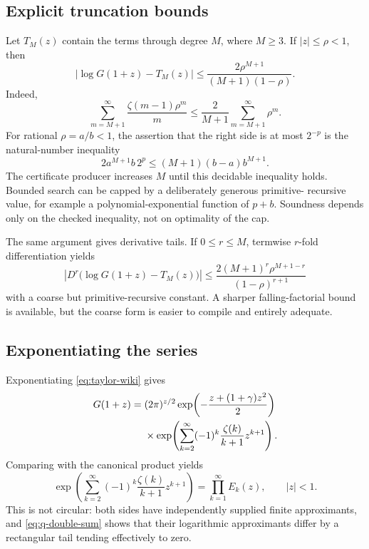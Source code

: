 \subsection{Explicit truncation bounds}

Let \(T_M(z)\) contain the terms through degree \(M\), where \(M\ge3\).  If
\(|z|\le\rho<1\), then
\begin{equation}\label{eq:taylor-tail}
 \left|\log G(1+z)-T_M(z)\right|
 \le
 \frac{2\rho^{M+1}}{(M+1)(1-\rho)}.
\end{equation}
Indeed,
\[
 \sum_{m=M+1}^{\infty}
 \frac{\zeta(m-1)\rho^m}{m}
 \le \frac2{M+1}\sum_{m=M+1}^{\infty}\rho^m.
\]
For rational \(\rho=a/b<1\), the assertion that the right side is at most
\(2^{-p}\) is the natural-number inequality
\begin{equation}\label{eq:taylor-tail-cleared}
 2a^{M+1}b\,2^p
 \le (M+1)(b-a)b^{M+1}.
\end{equation}
The certificate producer increases \(M\) until this decidable inequality
holds.  Bounded search can be capped by a deliberately generous primitive-
recursive value, for example a polynomial-exponential function of
\(p+b\).  Soundness depends only on the checked inequality, not on optimality
of the cap.

The same argument gives derivative tails.  If \(0\le r\le M\), termwise
\(r\)-fold differentiation yields
\begin{equation}\label{eq:taylor-derivative-tail}
 \left|D^r\bigl(\log G(1+z)-T_M(z)\bigr)\right|
 \le
 \frac{2(M+1)^r\rho^{M+1-r}}
      {(1-\rho)^{r+1}}
\end{equation}
with a coarse but primitive-recursive constant.  A sharper falling-factorial
bound is available, but the coarse form is easier to compile and entirely
adequate.

\subsection{Exponentiating the series}

Exponentiating \cref{eq:taylor-wiki} gives
\begin{align}
 G(1+z)={}&(2\pi)^{z/2}
 \exp\!\left(-\frac{z+(1+\gamma)z^2}{2}\right)\notag\\
 &\times
 \exp\!\left(
 \sum_{k=2}^{\infty}(-1)^k\frac{\zeta(k)}{k+1}z^{k+1}
 \right).
 \label{eq:exp-taylor}
\end{align}
Comparing with the canonical product yields
\begin{equation}\label{eq:series-product-relation}
 \exp\!\left(
 \sum_{k=2}^{\infty}(-1)^k\frac{\zeta(k)}{k+1}z^{k+1}
 \right)
 =\prod_{k=1}^{\infty}E_k(z),
 \qquad |z|<1.
\end{equation}
This is not circular: both sides have independently supplied finite
approximants, and \cref{eq:q-double-sum} shows that their logarithmic
approximants differ by a rectangular tail tending effectively to zero.

